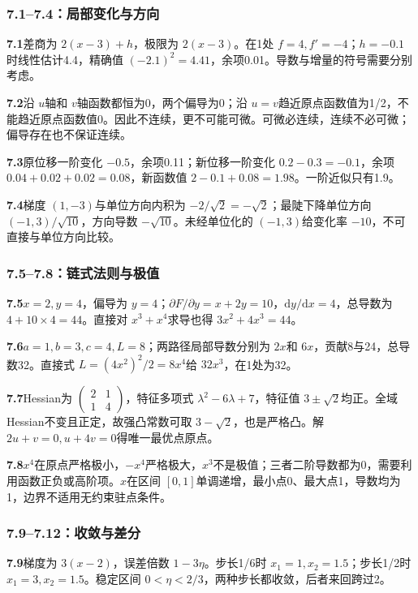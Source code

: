 \documentclass[UTF8,fontset=none,zihao=-4,a4paper]{ctexart}
\numberwithin{equation}{section}
\numberwithin{figure}{section}
\begin{document}
\subsubsection*{7.1--7.4：局部变化与方向}
\textbf{7.1}\quad 差商为 $2(x-3)+h$，极限为 $2(x-3)$。在1处 $f=4,f'=-4$；$h=-0.1$时线性估计4.4，精确值 $(-2.1)^2=4.41$，余项0.01。导数与增量的符号需要分别考虑。

\textbf{7.2}\quad 沿 $u$轴和 $v$轴函数都恒为0，两个偏导为0；沿 $u=v$趋近原点函数值为1/2，不能趋近原点函数值0。因此不连续，更不可能可微。可微必连续，连续不必可微；偏导存在也不保证连续。

\textbf{7.3}\quad 原位移一阶变化 $-0.5$，余项0.11；新位移一阶变化 $0.2-0.3=-0.1$，余项 $0.04+0.02+0.02=0.08$，新函数值 $2-0.1+0.08=1.98$。一阶近似只有1.9。

\textbf{7.4}\quad 梯度 $(1,-3)$与单位方向内积为 $-2/\sqrt2=-\sqrt2$；最陡下降单位方向 $(-1,3)/\sqrt{10}$，方向导数 $-\sqrt{10}$。未经单位化的 $(-1,3)$给变化率 $-10$，不可直接与单位方向比较。

\subsubsection*{7.5--7.8：链式法则与极值}
\textbf{7.5}\quad $x=2,y=4$，偏导为 $y=4$；$\partial F/\partial y=x+2y=10$，$\mathrm dy/\mathrm dx=4$，总导数为 $4+10\times4=44$。直接对 $x^3+x^4$求导也得 $3x^2+4x^3=44$。

\textbf{7.6}\quad $a=1,b=3,c=4,L=8$；两路径局部导数分别为 $2x$和 $6x$，贡献8与24，总导数32。直接式 $L=(4x^2)^2/2=8x^4$给 $32x^3$，在1处为32。

\textbf{7.7}\quad Hessian为 $\begin{pmatrix}2&1\\1&4\end{pmatrix}$，特征多项式 $\lambda^2-6\lambda+7$，特征值 $3\pm\sqrt2$均正。全域Hessian不变且正定，故强凸常数可取 $3-\sqrt2$，也是严格凸。解 $2u+v=0,u+4v=0$得唯一最优点原点。

\textbf{7.8}\quad $x^4$在原点严格极小，$-x^4$严格极大，$x^3$不是极值；三者二阶导数都为0，需要利用函数正负或高阶项。$x$在区间 $[0,1]$单调递增，最小点0、最大点1，导数均为1，边界不适用无约束驻点条件。

\subsubsection*{7.9--7.12：收敛与差分}
\textbf{7.9}\quad 梯度为 $3(x-2)$，误差倍数 $1-3\eta$。步长1/6时 $x_1=1,x_2=1.5$；步长1/2时 $x_1=3,x_2=1.5$。稳定区间 $0<\eta<2/3$，两种步长都收敛，后者来回跨过2。
\end{document}
